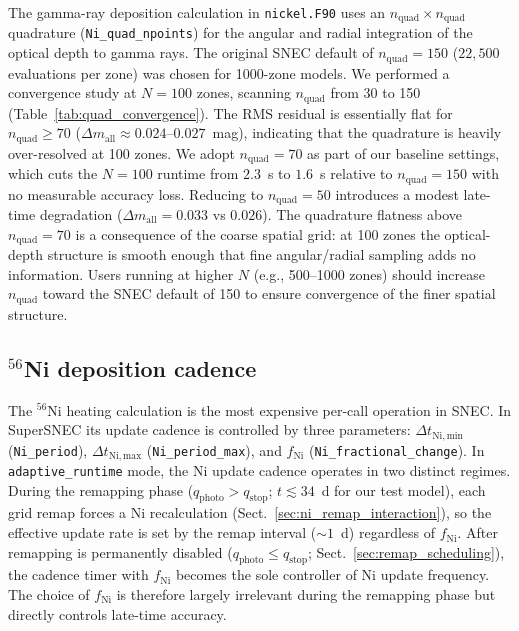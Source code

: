\documentclass[twocolumn,linenumbers]{aastex701}
\begin{document}
The gamma-ray deposition calculation in \texttt{nickel.F90} uses an $n_\mathrm{quad} \times n_\mathrm{quad}$ quadrature (\texttt{Ni\_quad\_\-npoints}) for the angular and radial integration of the optical depth to gamma rays. The original SNEC default of $n_\mathrm{quad} = 150$ ($22{,}500$ evaluations per zone) was chosen for 1000-zone models. We performed a convergence study at $N = 100$ zones, scanning $n_\mathrm{quad}$ from 30 to 150 (Table~\ref{tab:quad_convergence}). The RMS residual is essentially flat for $n_\mathrm{quad} \ge 70$ ($\Delta m_\mathrm{all} \approx 0.024$--$0.027$~mag), indicating that the quadrature is heavily over-resolved at 100 zones. We adopt $n_\mathrm{quad} = 70$ as part of our baseline settings, which cuts the $N=100$ runtime from $2.3$~s to $1.6$~s relative to $n_\mathrm{quad}=150$ with no measurable accuracy loss. Reducing to $n_\mathrm{quad} = 50$ introduces a modest late-time degradation ($\Delta m_\mathrm{all} = 0.033$ vs $0.026$). The quadrature flatness above $n_\mathrm{quad} = 70$ is a consequence of the coarse spatial grid: at 100 zones the optical-depth structure is smooth enough that fine angular/radial sampling adds no information. Users running at higher $N$ (e.g., 500--1000 zones) should increase $n_\mathrm{quad}$ toward the SNEC default of 150 to ensure convergence of the finer spatial structure.

\subsection{$^{56}$Ni deposition cadence}
\label{sec:ni_cadence_sweep}

The $^{56}$Ni heating calculation is the most expensive per-call operation in SNEC. In SuperSNEC its update cadence is controlled by three parameters: $\Delta t_{\mathrm{Ni,min}}$ (\texttt{Ni\_period}), $\Delta t_{\mathrm{Ni,max}}$ (\texttt{Ni\_period\_\-max}), and $f_{\mathrm{Ni}}$ (\texttt{Ni\_fractional\_\-change}). In \texttt{adaptive\_\-runtime} mode, the Ni update cadence operates in two distinct regimes. During the remapping phase ($q_\mathrm{photo} > q_\mathrm{stop}$; $t \lesssim 34$~d for our test model), each grid remap forces a Ni recalculation (Sect.~\ref{sec:ni_remap_interaction}), so the effective update rate is set by the remap interval (${\sim}1$~d) regardless of $f_{\mathrm{Ni}}$. After remapping is permanently disabled ($q_\mathrm{photo} \le q_\mathrm{stop}$; Sect.~\ref{sec:remap_scheduling}), the cadence timer with $f_{\mathrm{Ni}}$ becomes the sole controller of Ni update frequency. The choice of $f_{\mathrm{Ni}}$ is therefore largely irrelevant during the remapping phase but directly controls late-time accuracy.
\end{document}
